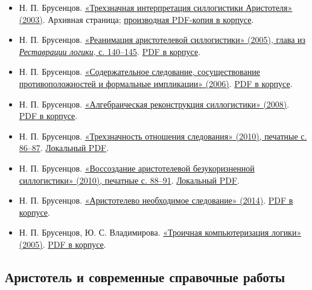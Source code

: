 \documentclass[12pt,a4paper]{article}
\begin{document}
\begin{itemize}
\item Н. П. Брусенцов. \href{https://computer-museum.ru/histussr/trilog0.htm}{«Трехзначная интерпретация силлогистики Аристотеля» (2003)}. Архивная страница; \href{../sources/pdfs/Брусенцов_Трехзначная-интерпретация-силлогистики-Аристотеля_2003_версия-музея.pdf}{производная PDF-копия в корпусе}.
\item Н. П. Брусенцов. \href{https://ternarycomp.cs.msu.ru/Papers/Rea.pdf}{«Реанимация аристотелевой силлогистики» (2005), глава из \emph{Реставрации логики}, с. 140–145}. \href{../sources/pdfs/Брусенцов_Реанимация-аристотелевой-силлогистики_2005-глава-из-Реставрации-логики.pdf}{PDF в корпусе}.
\item Н. П. Брусенцов. \href{https://ternarycomp.cs.msu.ru/Papers/Soder_sled.pdf}{«Содержательное следование, сосуществование противоположностей и формальные импликации» (2006)}. \href{../sources/pdfs/Брусенцов_Содержательное-следование-и-формальные-импликации_2006.pdf}{PDF в корпусе}.
\item Н. П. Брусенцов. \href{https://ternarycomp.cs.msu.ru/Papers/Alrek.pdf}{«Алгебраическая реконструкция силлогистики» (2008)}. \href{../sources/pdfs/Брусенцов_Алгебраическая-реконструкция-силлогистики_2008.pdf}{PDF в корпусе}.
\item Н. П. Брусенцов. \href{https://ternarycomp.cs.msu.ru/Papers/brusentsov_sborn2010_1.pdf}{«Трехзначность отношения следования» (2010), печатные с. 86–87}. \href{../sources/pdfs/Брусенцов_Трехзначность-отношения-следования_2010.pdf}{Локальный PDF}.
\item Н. П. Брусенцов. \href{https://ternarycomp.cs.msu.ru/Papers/brusentsov_sborn2010_2.pdf}{«Воссоздание аристотелевой безукоризненной силлогистики» (2010), печатные с. 88–91}. \href{../sources/pdfs/Брусенцов_Воссоздание-аристотелевой-силлогистики_2010.pdf}{Локальный PDF}.
\item Н. П. Брусенцов. \href{https://ternarycomp.cs.msu.ru/Papers/Brusen_IMI14_Neobh_sled.pdf}{«Аристотелево необходимое следование» (2014)}. \href{../sources/pdfs/Брусенцов_Аристотелево-необходимое-следование-и-ДНФ_2014.pdf}{PDF в корпусе}.
\item Н. П. Брусенцов, Ю. С. Владимирова. \href{https://ternarycomp.cs.msu.ru/Papers/MMRO12.pdf}{«Троичная компьютеризация логики» (2005)}. \href{../sources/pdfs/Брусенцов_Владимирова_Троичная-компьютеризация-логики_2005_ММРО-12.pdf}{PDF в корпусе}.
\end{itemize}
\subsection{Аристотель и современные справочные работы}
\end{document}
